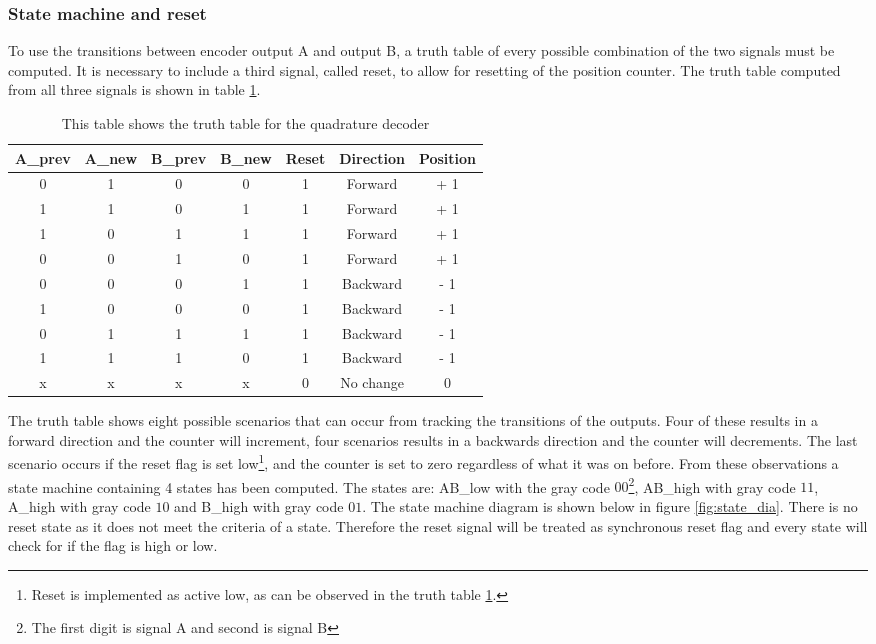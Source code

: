 \documentclass[../../../main]{subfiles}
\begin{document}
\subsubsection{State machine and reset}
\label{subsubsec:reset_state}
To use the transitions between encoder output A and output B, a truth table of every possible combination of the two signals must be computed. It is necessary to include a third signal, called reset, to allow for resetting of the position counter. The truth table computed from all three signals is shown in table \ref{fig:truth_table}.
\begin{table}[H]
  \centering
  \begin{tabular}{|c | c | c | c | c | c |c|}
  \hline
   A\_prev & A\_new & B\_prev & B\_new & Reset & Direction & Position \\
   \hline
   0 & 1 & 0 & 0 & 1 & Forward & + 1 \\
   1 & 1 & 0 & 1 & 1 & Forward & + 1 \\
   1 & 0 & 1 & 1 & 1 & Forward & + 1 \\
   0 & 0 & 1 & 0 & 1 & Forward & + 1 \\
   0 & 0 & 0 & 1 & 1 & Backward & - 1 \\
   1 & 0 & 0 & 0 & 1 & Backward & - 1 \\
   0 & 1 & 1 & 1 & 1 & Backward & - 1 \\
   1 & 1 & 1 & 0 & 1 & Backward & - 1 \\
   x & x & x & x & 0 & No change &  0 \\
   \hline
  \end{tabular}
  \caption{This table shows the truth table for the quadrature decoder}
  \label{fig:truth_table}
\end{table}
The truth table shows eight possible scenarios that can occur from tracking the transitions of the outputs. Four of these results in a forward direction and the counter will increment, four scenarios results in a backwards direction and the counter will decrements. The last scenario occurs if the reset flag is set low\footnote{Reset is implemented as active low, as can be observed in the truth table \ref{fig:truth_table}.}, and the counter is set to zero regardless of what it was on before. From these observations a state machine containing 4 states has been computed. The states are: AB\_low with the gray code $00$\footnote{The first digit is signal A and second is signal B}, AB\_high with gray code $11$, A\_high with gray code $10$ and B\_high with gray code $01$. The state machine diagram is shown below in figure \ref{fig:state_dia}.  There is no reset state as it does not meet the criteria of a state. Therefore the reset signal will be treated as synchronous reset flag and every state will check for if the flag is high or low. \\
\end{document}
